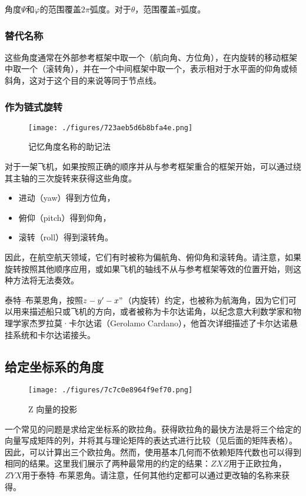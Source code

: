 角度$\Psi$和$\varphi$的范围覆盖$2\pi$弧度。对于$\theta$，范围覆盖$\pi$弧度。
\subsubsection{替代名称}  
这些角度通常在外部参考框架中取一个（航向角、方位角），在内旋转的移动框架中取一个（滚转角），并在一个中间框架中取一个，表示相对于水平面的仰角或倾斜角，这对于这个目的来说等同于节点线。
\subsubsection{作为链式旋转}
\begin{figure}[ht]
\centering
\texttt{[image: ./figures/723aeb5d6b8bfa4e.png]}
\caption{记忆角度名称的助记法} \label{fig_OLJ_8}
\end{figure}
对于一架飞机，如果按照正确的顺序并从与参考框架重合的框架开始，可以通过绕其主轴的三次旋转来获得这些角度。
\begin{itemize}
\item 进动（yaw）得到方位角，
\item 俯仰（pitch）得到仰角，
\item 滚转（roll）得到滚转角。
\end{itemize}
因此，在航空航天领域，它们有时被称为偏航角、俯仰角和滚转角。请注意，如果旋转按照其他顺序应用，或如果飞机的轴线不从与参考框架等效的位置开始，则这种方法将无法奏效。

泰特–布莱恩角，按照$z-y'-x"$（内旋转）约定，也被称为航海角，因为它们可以用来描述船只或飞机的方向，或者被称为卡尔达诺角，以纪念意大利数学家和物理学家杰罗拉莫·卡尔达诺（Gerolamo Cardano），他首次详细描述了卡尔达诺悬挂系统和卡尔达诺接头。
\subsection{给定坐标系的角度}
\begin{figure}[ht]
\centering
\texttt{[image: ./figures/7c7c0e8964f9ef70.png]}
\caption{Z 向量的投影} \label{fig_OLJ_9}
\end{figure}
一个常见的问题是求给定坐标系的欧拉角。获得欧拉角的最快方法是将三个给定的向量写成矩阵的列，并将其与理论矩阵的表达式进行比较（见后面的矩阵表格）。因此，可以计算出三个欧拉角。然而，使用基本几何而不依赖矩阵代数也可以得到相同的结果。这里我们展示了两种最常用的约定的结果：$ZXZ$用于正欧拉角，$ZYX$用于泰特–布莱恩角。请注意，任何其他约定都可以通过更改轴的名称来获得。

